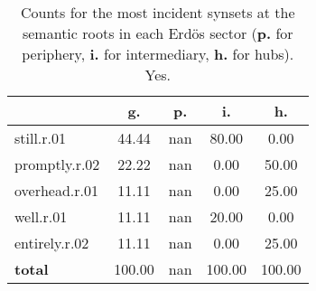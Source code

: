 \begin{table}[h!]
\begin{center}
\begin{tabular}{| l || c | c | c | c |}\hline
 & {\bf g.} & {\bf p.} & {\bf i.} & {\bf h.} \\\hline\hline
still.r.01 & 44.44  & nan  & 80.00  & 0.00 \\\hline
promptly.r.02 & 22.22  & nan  & 0.00  & 50.00 \\\hline
overhead.r.01 & 11.11  & nan  & 0.00  & 25.00 \\\hline
well.r.01 & 11.11  & nan  & 20.00  & 0.00 \\\hline
entirely.r.02 & 11.11  & nan  & 0.00  & 25.00 \\\hline\hline
{{\bf total}} & 100.00  & nan  & 100.00  & 100.00 \\\hline
\end{tabular}
\caption{Counts for the most incident synsets at the semantic roots in each Erd\"os sector ({\bf p.} for periphery, {\bf i.} for intermediary, {\bf h.} for hubs). Yes.}
\end{center}
\end{table}